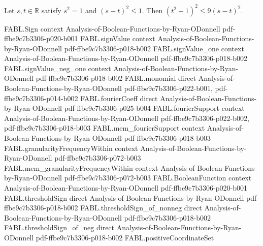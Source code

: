 \begin{theorem}
\label{FABL.sq_sq_sub_one_le_nine_mul_sq_sub}
\leanok
{}
Let $s,t\in\mathbb R$ satisfy $s^2=1$ and $(s-t)^2\le1$. Then
$(t^2-1)^2\le9(s-t)^2$.
\end{theorem}

\begin{theorem}
\label{FABL.exercise9_5}
\leanok
{}
\proofstep
  {FABL.Sign}
  {context}
  {Analysis-of-Boolean-Functions-by-Ryan-ODonnell}
  {pdf-ffbe9c7b3306-p020-b001}
\proofstep
  {FABL.signValue}
  {context}
  {Analysis-of-Boolean-Functions-by-Ryan-ODonnell}
  {pdf-ffbe9c7b3306-p018-b002}
\proofstep
  {FABL.signValue_one}
  {context}
  {Analysis-of-Boolean-Functions-by-Ryan-ODonnell}
  {pdf-ffbe9c7b3306-p018-b002}
\proofstep
  {FABL.signValue_neg_one}
  {context}
  {Analysis-of-Boolean-Functions-by-Ryan-ODonnell}
  {pdf-ffbe9c7b3306-p018-b002}
\proofstep
  {FABL.monomial}
  {direct}
  {Analysis-of-Boolean-Functions-by-Ryan-ODonnell}
  {pdf-ffbe9c7b3306-p022-b001,
    pdf-ffbe9c7b3306-p014-b002}
\proofstep
  {FABL.fourierCoeff}
  {direct}
  {Analysis-of-Boolean-Functions-by-Ryan-ODonnell}
  {pdf-ffbe9c7b3306-p025-b004}
\proofstep
  {FABL.fourierSupport}
  {context}
  {Analysis-of-Boolean-Functions-by-Ryan-ODonnell}
  {pdf-ffbe9c7b3306-p022-b002,
    pdf-ffbe9c7b3306-p018-b003}
\proofstep
  {FABL.mem_fourierSupport}
  {context}
  {Analysis-of-Boolean-Functions-by-Ryan-ODonnell}
  {pdf-ffbe9c7b3306-p018-b003}
\proofstep
  {FABL.granularityFrequencyWithin}
  {context}
  {Analysis-of-Boolean-Functions-by-Ryan-ODonnell}
  {pdf-ffbe9c7b3306-p072-b003}
\proofstep
  {FABL.mem_granularityFrequencyWithin}
  {context}
  {Analysis-of-Boolean-Functions-by-Ryan-ODonnell}
  {pdf-ffbe9c7b3306-p072-b003}
\proofstep
  {FABL.BooleanFunction}
  {context}
  {Analysis-of-Boolean-Functions-by-Ryan-ODonnell}
  {pdf-ffbe9c7b3306-p020-b001}
\proofstep
  {FABL.thresholdSign}
  {direct}
  {Analysis-of-Boolean-Functions-by-Ryan-ODonnell}
  {pdf-ffbe9c7b3306-p018-b002}
\proofstep
  {FABL.thresholdSign_of_nonneg}
  {direct}
  {Analysis-of-Boolean-Functions-by-Ryan-ODonnell}
  {pdf-ffbe9c7b3306-p018-b002}
\proofstep
  {FABL.thresholdSign_of_neg}
  {direct}
  {Analysis-of-Boolean-Functions-by-Ryan-ODonnell}
  {pdf-ffbe9c7b3306-p018-b002}
\proofstep
  {FABL.positiveCoordinateSet}

\end{theorem}
